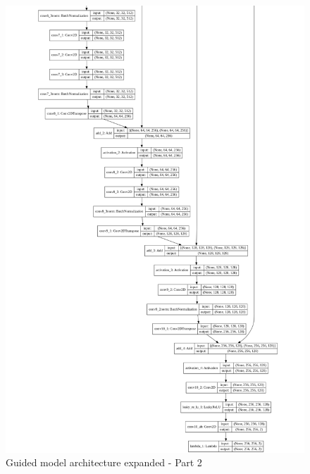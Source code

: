 \documentclass[12pt,openright,oneside,a4paper,english]{abntex2}
\begin{document}
\begin{otherlanguage}{english}
\begin{figure}[!htb]
\centering
\includegraphics[height=\textheight]{model_plot/Guided2}
\caption{Guided model architecture expanded - Part 2}
\label{guided_plot_2}
\end{figure}


\end{otherlanguage}
\end{document}
